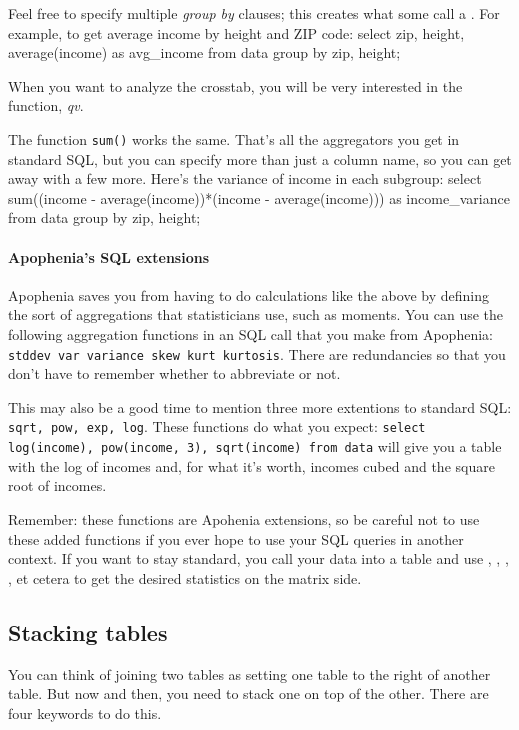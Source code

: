 Feel free to specify multiple {\sl group by} clauses; this creates what
some call a . For example, to get average income by
height and ZIP code: 
select  zip, height, average(income) as avg_income
from data
group by zip, height;

When you want to analyze the crosstab, you will be very
interested in the  function, {\em qv}.

The function {\tt sum()} works the same. That's all the aggregators you
get in standard SQL, but you can specify more than just a column name, so you can get
away with a few more. Here's the variance of income in each subgroup:
select  sum((income - average(income))*(income - average(income))) 
               as income_variance
from data
group by zip, height;

\paragraph{Apophenia's SQL extensions}
Apophenia saves you from having to do calculations like the above by
defining the sort of aggregations that statisticians use, such as
moments. You can use the following aggregation functions in an SQL
call that you make from Apophenia: {\tt stddev var variance skew kurt
kurtosis}. There are redundancies so that you don't have to remember
whether to abbreviate or not.

This may also be a good time to mention three more extentions to
standard SQL: {\tt sqrt, pow, exp, log}. These functions do what you
expect: {\tt select log(income), pow(income, 3), sqrt(income) from data} will give
you a table with the log of incomes and, for what it's worth, incomes
cubed and the square root of incomes.

Remember: these functions are Apohenia extensions, so be careful not to
use these added functions if you ever hope to use your SQL queries in
another context. If you want to stay standard, you call your data into
a table and use , ,
, , et cetera to get the desired
statistics on the matrix side.

\subsection{Stacking tables}
You can think of joining two tables as setting one table to the right of
another table. But now and then, you need to stack one on top of
the other. There are four keywords to do this.

